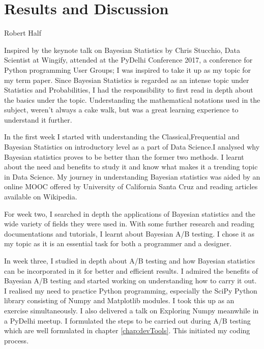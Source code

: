 \chapter{Results and Discussion}
\label{chap:resultsAndDiscussion}
\begin{epigraphs}
         {Robert Half}
\end{epigraphs}

Inspired by the keynote talk on Bayesian Statistics by Chris Stucchio, Data Scientist at Wingify, attended at the PyDelhi Conference 2017, a conference for Python programming User Groups; I was inspired to take it up as my topic for my term paper. Since Bayesian Statistics is regarded as an intense topic under Statistics and Probabilities, I had the responsibility to first read in depth about the basics under the topic. Understanding the mathematical notations used in the subject, weren't always a cake walk, but was a great learning experience to understand it further. \par
In the first week I started with understanding the Classical,Frequential and Bayesian Statistics on introductory level as a part of Data Science.I analysed why Bayesian statistics proves to be better than the former two methods. I learnt about the need and benefits to study it and know what makes it a trending topic in Data Science. My journey in understanding Bayesian statistics was aided by an online MOOC offered by University of California Santa Cruz and reading articles available on Wikipedia.\par
For week two, I searched in depth the applications of Bayesian statistics and the wide variety of fields they were used in. With some further research and reading documentations and tutorials, I learnt about Bayesian A/B testing. I chose it as my topic as it is an essential task for both a programmer and a designer. \par
In week three, I studied in depth about A/B testing and how Bayesian statistics can be incorporated in it for better and efficient results. I admired the benefits of Bayesian A/B testing and started working on understanding how to carry it out. I realised my need to practice Python programming, especially the SciPy Python library consisting of Numpy and Matplotlib modules. I took this up as an exercise simultaneously. I also delivered a talk on Exploring Numpy meanwhile in a PyDelhi meetup. I formulated the steps to be carried out during A/B testing which are well formulated in chapter \ref{chap:devTools}. This initiated my coding process. \par \newline
